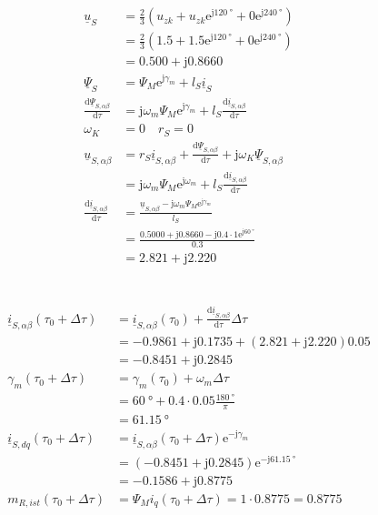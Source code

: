 \documentclass[11pt,a4paper]{scrartcl}
\newcommand{\mybr}[1]{\left(#1\right)}
\renewcommand{\j}{\mathrm{j}}
\renewcommand{\u}{\underline{u}}
\renewcommand{\i}{\underline{i}}
\newcommand{\PPsi}{\underline{\Psi}}
\newcommand{\0}{_{\mybr{0}}}
\newcommand{\1}{_{\mybr{1}}}
\newcommand{\2}{_{\mybr{2}}}
\renewcommand{\e}{\mathrm{e}}
\renewcommand{\d}{\mathrm{d}}
\newcommand{\isab}{\i_{S,\alpha\beta}}
\newcommand{\isdq}{\i_{S,dq}}
\newcommand{\usab}{\u_{S,\alpha\beta}}
\newcommand{\psab}{\PPsi_{S,\alpha\beta}}
\begin{document}
\section{}
\begin{align}
\u_S&=\frac{2}{3}\mybr{u_{zk}+u_{zk}\e^{\j\SI{120}{\degree}}+0\e^{\j\SI{240}{\degree}}}\\
&=\frac{2}{3}\mybr{\num{1.5}+\num{1.5}\e^{\j\SI{120}{\degree}}+0\e^{\j\SI{240}{\degree}}}\\
&=\num{0.500}+\j\num{0.8660}\\
\PPsi_S&=\Psi_M\e^{\j\gamma_m}+l_S\i_S\\
\frac{\d\psab}{\d\tau}&=\j\omega_m\Psi_M\e^{\j\gamma_m}+l_S\frac{\d\isab}{\d\tau}\\
\omega_K&=0\quad r_S=0\\
\usab&=r_S\isab+\frac{\d\psab}{\d\tau}+\j\omega_K\psab\\
&=\j\omega_m\Psi_M\e^{\j\omega_m}+l_S\frac{\d\isab}{\d\tau}\\
\frac{\d\isab}{\d\tau}&=\frac{\usab-\j\omega_m\Psi_M\e^{\j\gamma_m}}{l_S}\\
&=\frac{\num{0.5000}+\j\num{0.8660}-\j\num{0.4}\cdot 1\e^{\j\SI{60}{\degree}}}{\num{0.3}}\\
&=\num{2.821}+\j\num{2.220}
\end{align}

\section{}
\begin{align}
\isab\mybr{\tau_0+\Delta\tau}&=\isab\mybr{\tau_0}+\frac{\d\isab}{\d\tau}\Delta\tau\\
&=\num{-0.9861}+\j\num{0.1735}+\mybr{\num{2.821}+\j\num{2.220}}\num{0.05}\\
&=\num{-0.8451}+\j\num{0.2845}\\
\gamma_m\mybr{\tau_0+\Delta\tau}&=\gamma_m\mybr{\tau_0}+\omega_m\Delta\tau\\
&=\SI{60}{\degree}+\num{0.4}\cdot\num{0.05}\frac{\SI{180}{\degree}}{\pi}\\
&=\SI{61.15}{\degree}\\
\isdq\mybr{\tau_0+\Delta\tau}&=\isab\mybr{\tau_0+\Delta\tau}\e^{-\j\gamma_m}\\
&=\mybr{\num{-0.8451}+\j\num{0.2845}}\e^{-\j\SI{61.15}{\degree}}\\
&=\num{-0.1586}+\j\num{0.8775}\\
m_{R,ist}\mybr{\tau_0+\Delta\tau}&=\Psi_M i_q\mybr{\tau_0+\Delta\tau}=1\cdot\num{0.8775}=\num{0.8775}
\end{align}
\end{document}
